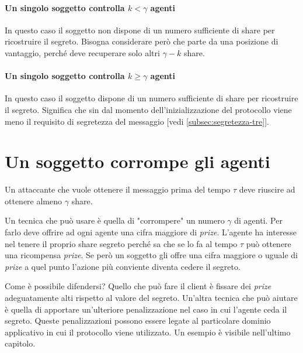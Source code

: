 \paragraph{Un singolo soggetto controlla $ k < \gamma $ agenti}
In questo caso il soggetto non dispone di un numero sufficiente di share per
ricostruire il segreto. Bisogna considerare però che parte da una posizione di
vantaggio, perché deve recuperare solo altri $ \gamma - k $ share.
\paragraph{Un singolo soggetto controlla $ k \geq \gamma $ agenti}
In questo caso il soggetto dispone di un numero sufficiente di share per
ricostruire il segreto. Significa che sin dal momento dell'inizializzazione
del protocollo viene meno il requisito di
segretezza del messaggio [vedi \ref{subsec:segretezza-tre}].


\section{Un soggetto corrompe gli agenti}
Un attaccante che vuole ottenere il messaggio prima del tempo $ \tau $ deve riuscire
ad ottenere almeno $ \gamma $ share.

Un tecnica che può usare è quella di "corrompere" un numero $ \gamma $ di agenti.
Per farlo deve offrire ad ogni agente una cifra maggiore di \textit{prize}.
L'agente ha interesse nel tenere il proprio share segreto perché sa che se lo fa
al tempo $ \tau $ può ottenere una ricompensa \textit{prize}.
Se però un soggetto gli
offre una cifra maggiore o uguale di \textit{prize} a quel punto l'azione
più conviente diventa cedere il segreto.

Come è possibile difendersi? Quello che può fare il client è fissare dei
\textit{prize} adeguatamente alti rispetto al valore del segreto.
Un'altra tecnica che può aiutare è quella di
apportare un'ulteriore penalizzazione nel
caso in cui l'agente ceda il segreto. Queste penalizzazioni possono essere
legate al particolare dominio applicativo in cui il protocollo viene utilizzato.
Un esempio è visibile nell'ultimo capitolo.
